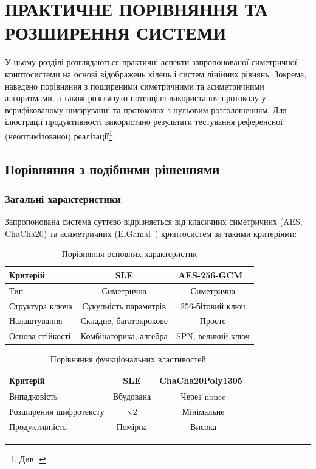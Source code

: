 \chapter{ПРАКТИЧНЕ ПОРІВНЯННЯ ТА РОЗШИРЕННЯ СИСТЕМИ}\label{ch:---:----}

У цьому розділі розглядаються практичні аспекти запропонованої симетричної криптосистеми на основі відображень кілець і систем лінійних рівнянь. Зокрема, наведено порівняння з поширеними симетричними та асиметричними алгоритмами, а також розглянуто потенціал використання протоколу у верифікованому шифруванні та протоколах з нульовим розголошенням. Для ілюстрації продуктивності використано результати тестування референсної (неоптимізованої) реалізації\footnote{Див. \cite{KyrylR24SLE}}.

\section{Порівняння з подібними рішеннями}

\subsection{Загальні характеристики}

Запропонована система суттєво відрізняється від класичних симетричних (AES, ChaCha20) та асиметричних (ElGamal~\cite{ElGamal85}) криптосистем за такими критеріями:

\begin{table}[h!]
\centering
\begin{tabular}{|l|c|c|}
\hline
\textbf{Критерій} & \textbf{SLE} & \textbf{AES-256-GCM}~\cite{NISTSP800-38D, RustCryptoAESGCMDocs} \\
\hline
Тип & Симетрична & Симетрична \\
\hline
Структура ключа & Сукупність параметрів & 256-бітовий ключ \\
\hline
Налаштування & Складне, багатокрокове & Просте \\
\hline
Основа стійкості & Комбінаторика, алгебра & SPN, великий ключ \\
\hline
\end{tabular}
\caption{Порівняння основних характеристик}
\label{tab:table}
\end{table}

\begin{table}[h!]
\centering
\begin{tabular}{|l|c|c|}
\hline
\textbf{Критерій} & \textbf{SLE} & \textbf{ChaCha20Poly1305}~\cite{RFC8439, RustCryptoChaChaPoly1305Docs} \\
\hline
Випадковість & Вбудована & Через nonce \\
\hline
Розширення шифротексту & $\times 2$ & Мінімальне \\
\hline
Продуктивність & Помірна & Висока \\
\hline
\end{tabular}
\caption{Порівняння функціональних властивостей}
\label{tab:table2}
\end{table}


